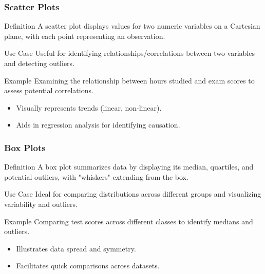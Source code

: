 \documentclass[aspectratio=169]{beamer}
\begin{document}
\begin{frame}[fragile]
    \frametitle{Scatter Plots}

    \begin{block}{Definition}
        A scatter plot displays values for two numeric variables on a Cartesian plane, with each point representing an observation.
    \end{block}

    \begin{block}{Use Case}
        Useful for identifying relationships/correlations between two variables and detecting outliers.
    \end{block}

    \begin{block}{Example}
        Examining the relationship between hours studied and exam scores to assess potential correlations.
    \end{block}
    
    \begin{itemize}
        \item Visually represents trends (linear, non-linear).
        \item Aids in regression analysis for identifying causation.
    \end{itemize}
\end{frame}

\begin{frame}[fragile]
    \frametitle{Box Plots}

    \begin{block}{Definition}
        A box plot summarizes data by displaying its median, quartiles, and potential outliers, with "whiskers" extending from the box.
    \end{block}

    \begin{block}{Use Case}
        Ideal for comparing distributions across different groups and visualizing variability and outliers.
    \end{block}

    \begin{block}{Example}
        Comparing test scores across different classes to identify medians and outliers.
    \end{block}

    \begin{itemize}
        \item Illustrates data spread and symmetry.
        \item Facilitates quick comparisons across datasets.
    \end{itemize}
\end{frame}
\end{document}
